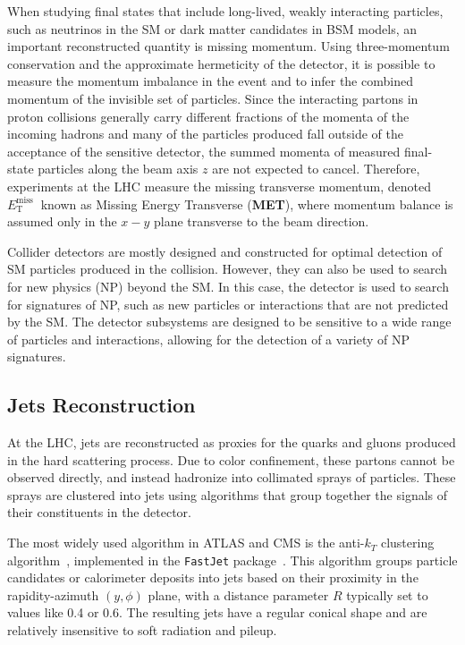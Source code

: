 When studying final states that include long-lived, weakly interacting particles, such as neutrinos in the SM or dark matter candidates in BSM models, an important reconstructed quantity is missing momentum.  Using three-momentum conservation and the approximate hermeticity of the detector, it is possible to measure the momentum imbalance in the event and to infer the combined momentum of the invisible set of particles. Since the interacting partons in proton collisions generally carry different fractions of the momenta of the incoming hadrons and many of the particles produced fall outside of the acceptance of the sensitive detector, the summed momenta of measured final-state particles along the beam axis $z$ are not expected to cancel. Therefore, experiments at the LHC measure the missing transverse momentum, denoted $E_{\mathrm{T}}^{\text {miss }}$ known as Missing Energy Transverse (\textbf{MET}), where momentum balance is assumed only in the $x-y$ plane transverse to the beam direction.

Collider detectors are mostly designed and constructed for optimal detection of SM particles produced in the collision. However, they can also be used to search for new physics (NP) beyond the SM. In this case, the detector is used to search for signatures of NP, such as new particles or interactions that are not predicted by the SM. The detector subsystems are designed to be sensitive to a wide range of particles and interactions, allowing for the detection of a variety of NP signatures.

\subsection{Jets Reconstruction}

At the LHC, jets are reconstructed as proxies for the quarks and gluons produced in the hard scattering process. Due to color confinement, these partons cannot be observed directly, and instead hadronize into collimated sprays of particles. These sprays are clustered into jets using algorithms that group together the signals of their constituents in the detector.

The most widely used algorithm in ATLAS and CMS is the anti-$k_T$ clustering algorithm~\parencite{Cacciari:2008gp}, implemented in the \texttt{FastJet} package~\parencite{Cacciari:2011ma}. This algorithm groups particle candidates or calorimeter deposits into jets based on their proximity in the rapidity-azimuth $(y,\phi)$ plane, with a distance parameter $R$ typically set to values like 0.4 or 0.6. The resulting jets have a regular conical shape and are relatively insensitive to soft radiation and pileup.


